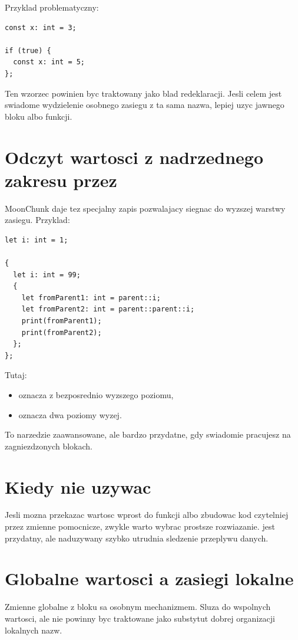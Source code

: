 Przyklad problematyczny:

\begin{lstlisting}[style=moonchunk,caption={Redeclaracja w ciele if}]
const x: int = 3;

if (true) {
  const x: int = 5;
};
\end{lstlisting}

Ten wzorzec powinien byc traktowany jako blad redeklaracji. Jesli celem jest swiadome
wydzielenie osobnego zasiegu z ta sama nazwa, lepiej uzyc jawnego bloku 
albo funkcji.

\section{Odczyt wartosci z nadrzednego zakresu przez }
MoonChunk daje tez specjalny zapis pozwalajacy siegnac do wyzszej warstwy zasiegu.
Przyklad:

\begin{lstlisting}[style=moonchunk,caption={Odczyt z parent::}]
let i: int = 1;

{
  let i: int = 99;
  {
    let fromParent1: int = parent::i;
    let fromParent2: int = parent::parent::i;
    print(fromParent1);
    print(fromParent2);
  };
};
\end{lstlisting}

Tutaj:

\begin{itemize}
  \item {} oznacza  z bezposrednio wyzszego poziomu,
  \item {} oznacza  dwa poziomy wyzej.
\end{itemize}

To narzedzie zaawansowane, ale bardzo przydatne, gdy swiadomie pracujesz na zagniezdzonych
blokach.

\section{Kiedy nie uzywac }
Jesli mozna przekazac wartosc wprost do funkcji albo zbudowac kod czytelniej przez
zmienne pomocnicze, zwykle warto wybrac prostsze rozwiazanie.  jest
przydatny, ale naduzywany szybko utrudnia sledzenie przeplywu danych.

\section{Globalne wartosci a zasiegi lokalne}
Zmienne globalne z bloku  sa osobnym mechanizmem. Sluza do wspolnych wartosci,
ale nie powinny byc traktowane jako substytut dobrej organizacji lokalnych nazw.

